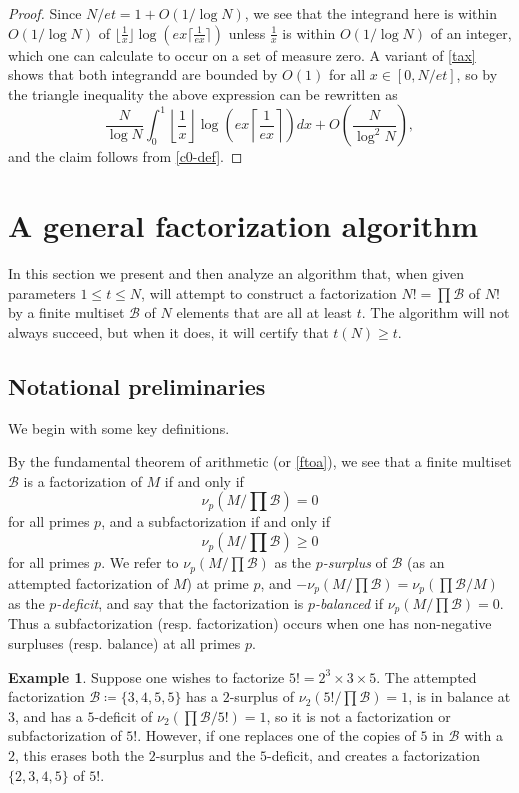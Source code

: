 \documentclass[12pt,a4paper,reqno]{amsart}
\numberwithin{equation}{section}
\theoremstyle{plain}
\theoremstyle{definition}
\newtheorem{example}[theorem]{Example}
\newcommand\tuple{{\mathcal B}}
\begin{document}
\begin{proof}
Since $N/et = 1 + O(1/\log N)$, we see that the integrand here is within $O(1/\log N)$ of $\lfloor \frac{1}{x} \rfloor \log \left( e x \lceil \frac{1}{e x} \rceil \right)$ unless $\frac{1}{x}$ is within $O(1/\log N)$ of an integer, which one can calculate to occur on a set of measure zero.  A variant of \eqref{tax} shows that both integrandd are bounded by $O(1)$ for all $x \in [0,N/et]$, so by the triangle inequality the above expression can be rewritten as
$$ \frac{N}{\log N} \int_0^1 \left\lfloor \frac{1}{x} \right\rfloor \log \left( e x \left\lceil \frac{1}{e x} \right\rceil \right) dx + O\left( \frac{N}{\log^2 N}\right),$$
and the claim follows from \eqref{c0-def}.
\end{proof}



\section{A general factorization algorithm}

In this section we present and then analyze an algorithm that, when given parameters $1 \leq t \leq N$, will attempt to construct a factorization $N! = \prod \tuple$ of $N!$ by a finite multiset $\tuple$ of $N$ elements that are all at least $t$.  The algorithm will not always succeed, but when it does, it will certify that $t(N) \geq t$.

\subsection{Notational preliminaries}

We begin with some key definitions.



By the fundamental theorem of arithmetic (or \eqref{ftoa}), we see that a finite multiset $\tuple$ is a factorization of $M$ if and only if
$$ \nu_p( M / \prod \tuple ) = 0$$
for all primes $p$, and a subfactorization if and only if
$$ \nu_p( M / \prod \tuple ) \geq 0$$
for all primes $p$.  We refer to $\nu_p( M / \prod \tuple )$ as the \emph{$p$-surplus} of $\tuple$ (as an attempted factorization of $M$) at prime $p$, and $-\nu_p(M/\prod\tuple) = \nu_p(\prod\tuple/M)$ as the \emph{$p$-deficit}, and say that the factorization is \emph{$p$-balanced} if $\nu_p(M/\prod \tuple)=0$.  Thus a subfactorization (resp. factorization) occurs when one has non-negative surpluses (resp. balance) at all primes $p$.

\begin{example} Suppose one wishes to factorize $5! = 2^3 \times 3 \times 5$.  The attempted factorization ${\mathcal B} \coloneqq \{3,4,5,5\}$ has a $2$-surplus of $\nu_2(5!/\prod {\mathcal B}) = 1$, is in balance at $3$, and has a $5$-deficit of $\nu_2(\prod {\mathcal B}/5!) = 1$, so it is not a factorization or subfactorization of $5!$.  However, if one replaces one of the copies of $5$ in ${\mathcal B}$ with a $2$, this erases both the $2$-surplus and the $5$-deficit, and creates a factorization $\{2,3,4,5\}$ of $5!$.
\end{example}
\end{document}

